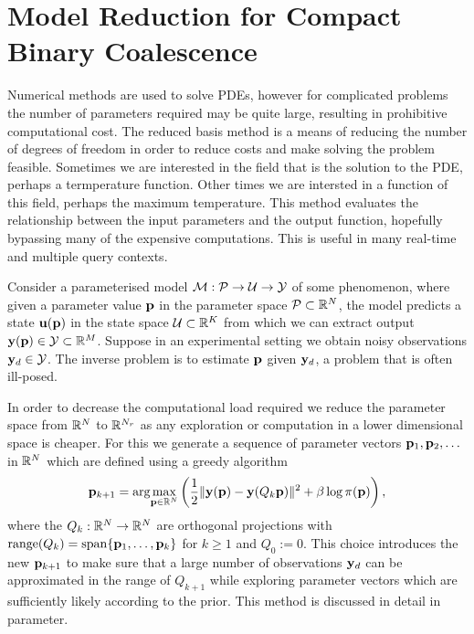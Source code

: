 %
%

\chapter{Model Reduction for Compact Binary Coalescence}

Numerical methods are used to solve PDEs, however for complicated problems the number of parameters required may be quite large, resulting in prohibitive computational cost. The reduced basis method is a means of reducing the number of degrees of freedom in order to reduce costs and make solving the problem feasible. Sometimes we are interested in the field that is the solution to the PDE, perhaps a termperature function. Other times we are intersted in a function of this field, perhaps the maximum temperature. This method evaluates the relationship between the input parameters and the output function, hopefully bypassing many of the expensive computations. This is useful in many real-time and multiple query contexts.

Consider a parameterised model $\mathcal{M}:\mathcal{P} \rightarrow \mathcal{U} \rightarrow \mathcal{Y}$ of some phenomenon, where given a parameter value $\mathbf{p}$ in the parameter space $\mathcal{P}\subset{\mathbb R}^N$, the model predicts a state ${\mathbf{u}}({\mathbf{p}})$ in the state space $\mathcal{U}\subset{\mathbb R}^K$ from which we can extract output  $\mathbf{y}(\mathbf{p})\in \mathcal{Y}\subset{\mathbb R}^M$. Suppose in an experimental setting we obtain noisy observations $\mathbf{y}_d\in \mathcal{Y}$. The inverse problem is to estimate $\mathbf{p}$ given $\mathbf{y}_d$, a problem that is often ill-posed. 

In order to decrease the computational load required we reduce the parameter space from ${\mathbb R}^N$ to ${\mathbb R}^{N_r}$ as any exploration or computation in a lower dimensional space is cheaper. 
For this we generate a sequence of parameter vectors $\mathbf{p}_1, \mathbf{p}_2,\ldots$ in ${\mathbb R}^N$ which are defined using a greedy algorithm 
\begin{equation}\label{eq:greedyOpt}
\mathbf{p}_{k+1} = \arg\!\max_{\mathbf{p}\in{\mathbb R}^N} \left(\frac{1}{2}\|\mathbf{y}(\mathbf{p})-\mathbf{y}(Q_k \mathbf{p})\|^2 + \beta \log \pi(\mathbf{p})\right),
\end{equation}
where the $Q_k:{\mathbb R}^N\rightarrow {\mathbb R}^N$ are orthogonal projections with 
$\operatorname{range}(Q_k)=\operatorname{span}\{\mathbf{p}_1,\ldots,\mathbf{p}_k\}$ for $k\geq 1$ and $Q_0:=0$. 
This choice introduces the new $\mathbf{p}_{k+1}$ to make sure that a large number of observations $\mathbf{y}_d$ can be approximated in the range of $Q_{k+1}$ while exploring parameter vectors which are sufficiently likely according to the prior. This method is discussed in detail in \cite{lieberman2009}parameter.
%


